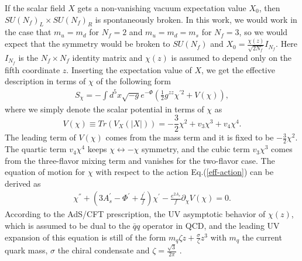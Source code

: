 \documentclass[aps,prd,showpacs,preprintnumbers,twocolumn]{revtex4}
\begin{document}
If the scalar field $X$ gets a non-vanishing vacuum expectation value $X_0$, then $SU(N_f)_L\times SU(N_f)_R$ is spontaneously broken.
In this work, we would work in the case that $m_u=m_d$ for $N_f=2$ and $m_u=m_d=m_s$ for $N_f=3$, so we would expect that the symmetry would be broken to $SU(N_f)$ and $X_0=\frac{\chi(z)}{\sqrt{2N_f}}I_{N_f}$. Here $I_{N_f}$ is the $N_f\times N_f$ identity matrix and $\chi(z)$ is assumed to depend only on the
 fifth coordinate $z$. Inserting the expectation value of $X$, we get the effective description in terms of $\chi$ of the following form
\begin{eqnarray}\label{eff-action}
S_{\chi}=-\int d^5x
 \sqrt{-g}e^{-\Phi}(\frac{1}{2}g^{zz}\chi^{'2}+V(\chi)),
\end{eqnarray}
where we simply denote the scalar potential in terms of $\chi$ as
\begin{equation}\label{profile-chi}
V(\chi)\equiv Tr({V_X(|X|)})=-\frac{3}{2}\chi^2+v_3 \chi^3+v_4 \chi^4.
\end{equation}
 The leading term of $V(\chi)$ comes from the mass term and it is fixed to be $-\frac{3}{2}\chi^2$. The quartic term $v_4 \chi^4$ keeps $\chi\leftrightarrow-\chi$ symmetry, and the cubic term $v_3 \chi^3$ comes from the three-flavor mixing term and vanishes for the two-flavor case.
The equation of motion for $\chi$ with respect to the action Eq.(\ref{eff-action}) can be derived as
\begin{eqnarray}\label{eom-chi-1}
\chi^{''}+(3A_s^{'}-\Phi^{'}+\frac{f^{'}}{f})\chi^{'}- \frac{e^{2A_s}}{f}\partial_\chi V(\chi)=0.
\end{eqnarray}
According to the AdS/CFT prescription, the UV asymptotic behavior of $\chi(z)$, which is assumed to be dual to the $\bar{q}q$ operator in QCD,
and the leading UV expansion of this equation is still of the form $m_q \zeta z+\frac{\sigma}{\zeta} z^3$ with $m_q$ the current quark mass, $\sigma$ the chiral condensate and $\zeta=\frac{\sqrt{3}}{2\pi}$ \cite{Cherman:2008eh}.
\end{document}
